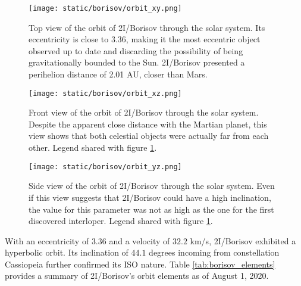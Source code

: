 \begin{figure}[H]
  \centering
  \texttt{[image: static/borisov/orbit\_xy.png]}
  \caption[Top view of the orbit of 2I/Borisov through the solar system]{
    Top view of the orbit of 2I/Borisov through the solar system. Its eccentricity is
    close to 3.36, making it the most eccentric object observed up to date
    and discarding the possibility of being gravitationally bounded to the Sun.
    2I/Borisov presented a perihelion distance of 2.01 AU, closer than Mars.
  }
  \label{fig:borisov_orbit}
\end{figure}


\begin{figure}[H]
  \centering
  \texttt{[image: static/borisov/orbit\_xz.png]}
  \caption[Front view of the orbit of 2I/Borisov through the solar system]{
    Front view of the orbit of 2I/Borisov through the solar system. Despite the
    apparent close distance with the Martian planet, this view shows that both
    celestial objects were actually far from each other. Legend shared with
        figure \ref{fig:borisov_orbit}.}
  \label{fig:borisov_orbit_xz}
\end{figure}

\begin{figure}[H]
  \centering
  \texttt{[image: static/borisov/orbit\_yz.png]}
  \caption[Side view of the orbit of 2I/Borisov through the solar system]{
    Side view of the orbit of 2I/Borisov through the solar system. Even if this
    view suggests that 2I/Borisov could have a high inclination, the value for this
    parameter was not as high as the one for the first discovered interloper.
        Legend shared with figure \ref{fig:borisov_orbit}.
  }
  \label{fig:borisov_orbit_yz}
\end{figure}

With an eccentricity of $3.36$ and a velocity of $32.2$ km/s, 2I/Borisov exhibited
a hyperbolic orbit. Its inclination of $44.1$ degrees incoming from
constellation Cassiopeia further confirmed its ISO nature. Table
\ref{tab:borisov_elements} provides a summary of 2I/Borisov's orbit elements as of
August 1, 2020.

